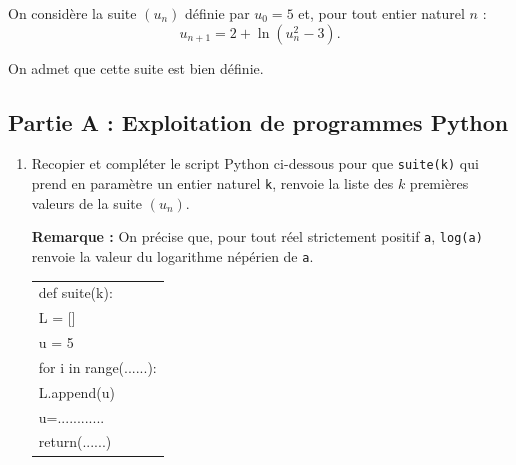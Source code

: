 
\medskip
	On considère la suite $(u_{n})$ définie par $u_{0}=5$ et, pour tout entier naturel $n$ :
	$$
	u_{n+1}=2+\ln \left(u_{n}^{2}-3\right).
	$$

	On admet que cette suite est bien définie.

	\subsection*{Partie A : Exploitation de programmes Python}

	\begin{enumerate}
		\item Recopier et compléter le script Python ci-dessous pour que \texttt{suite(k)} qui prend en paramètre un entier naturel \texttt{k}, renvoie la liste des $k$ premières valeurs de la suite $(u_{n})$.

		\medskip

		\textbf{Remarque :} On précise que, pour tout réel strictement positif \texttt{a}, \texttt{log(a)} renvoie la valeur du logarithme népérien de \texttt{a}.


		\begin{center}
		\begin{ttfamily}
		\begin{tabularx}{0.6\linewidth}{|X|}\hline
			def suite(k):\\
			\quad	L = []\\
			\quad	u = 5\\
			\quad	for i in range(......):\\
			\qquad	L.append(u)\\
			\qquad	u=............\\
			\quad	return(......)\\ \hline
		\end{tabularx}
		\end{ttfamily}
		\end{center}
		

\end{enumerate}
